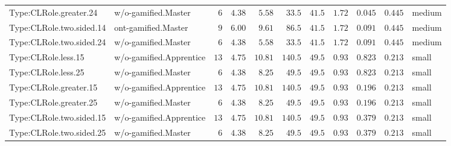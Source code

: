 \documentclass[6pt,a4paper]{article}
\begin{document}
{\begin{longtable}{llrrrrrrrrl}
Type:CLRole.greater.24&w/o-gamified.Master&$ 6$&$4.38$&$ 5.58$&$ 33.5$&$ 41.5$&$ 1.72$&$0.045$&$0.445$&medium\tabularnewline
Type:CLRole.two.sided.14&ont-gamified.Master&$ 9$&$6.00$&$ 9.61$&$ 86.5$&$ 41.5$&$ 1.72$&$0.091$&$0.445$&medium\tabularnewline
Type:CLRole.two.sided.24&w/o-gamified.Master&$ 6$&$4.38$&$ 5.58$&$ 33.5$&$ 41.5$&$ 1.72$&$0.091$&$0.445$&medium\tabularnewline
Type:CLRole.less.15&w/o-gamified.Apprentice&$13$&$4.75$&$10.81$&$140.5$&$ 49.5$&$ 0.93$&$0.823$&$0.213$&small\tabularnewline
Type:CLRole.less.25&w/o-gamified.Master&$ 6$&$4.38$&$ 8.25$&$ 49.5$&$ 49.5$&$ 0.93$&$0.823$&$0.213$&small\tabularnewline
Type:CLRole.greater.15&w/o-gamified.Apprentice&$13$&$4.75$&$10.81$&$140.5$&$ 49.5$&$ 0.93$&$0.196$&$0.213$&small\tabularnewline
Type:CLRole.greater.25&w/o-gamified.Master&$ 6$&$4.38$&$ 8.25$&$ 49.5$&$ 49.5$&$ 0.93$&$0.196$&$0.213$&small\tabularnewline
\newpage
Type:CLRole.two.sided.15&w/o-gamified.Apprentice&$13$&$4.75$&$10.81$&$140.5$&$ 49.5$&$ 0.93$&$0.379$&$0.213$&small\tabularnewline
Type:CLRole.two.sided.25&w/o-gamified.Master&$ 6$&$4.38$&$ 8.25$&$ 49.5$&$ 49.5$&$ 0.93$&$0.379$&$0.213$&small\tabularnewline
\hline
\end{longtable}}
\end{document}
